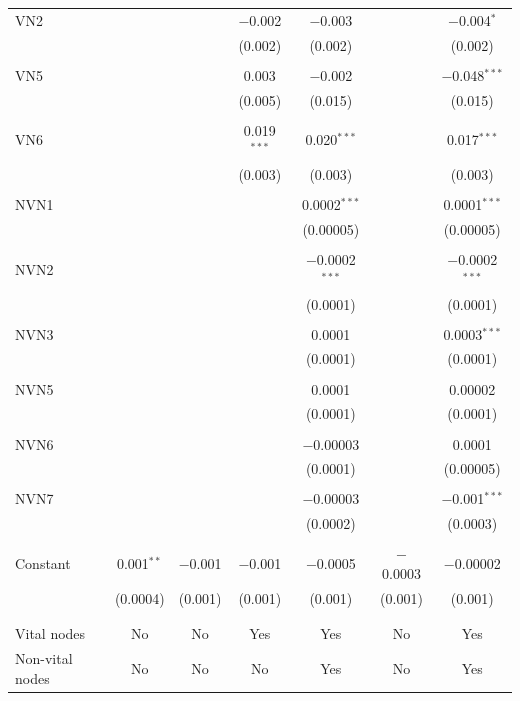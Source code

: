 \begin{table}[!htbp]
\begin{tabular}{@{\extracolsep{5pt}}lcccccc}
 VN2 &  &  & $-$0.002 & $-$0.003 &  & $-$0.004$^{*}$ \\ 
  &  &  & (0.002) & (0.002) &  & (0.002) \\ 
  & & & & & & \\ 
 VN5 &  &  & 0.003 & $-$0.002 &  & $-$0.048$^{***}$ \\ 
  &  &  & (0.005) & (0.015) &  & (0.015) \\ 
  & & & & & & \\ 
 VN6 &  &  & 0.019$^{***}$ & 0.020$^{***}$ &  & 0.017$^{***}$ \\ 
  &  &  & (0.003) & (0.003) &  & (0.003) \\ 
  & & & & & & \\ 
 NVN1 &  &  &  & 0.0002$^{***}$ &  & 0.0001$^{***}$ \\ 
  &  &  &  & (0.00005) &  & (0.00005) \\ 
  & & & & & & \\ 
 NVN2 &  &  &  & $-$0.0002$^{***}$ &  & $-$0.0002$^{***}$ \\ 
  &  &  &  & (0.0001) &  & (0.0001) \\ 
  & & & & & & \\ 
 NVN3 &  &  &  & 0.0001 &  & 0.0003$^{***}$ \\ 
  &  &  &  & (0.0001) &  & (0.0001) \\ 
  & & & & & & \\ 
 NVN5 &  &  &  & 0.0001 &  & 0.00002 \\ 
  &  &  &  & (0.0001) &  & (0.0001) \\ 
  & & & & & & \\ 
 NVN6 &  &  &  & $-$0.00003 &  & 0.0001 \\ 
  &  &  &  & (0.0001) &  & (0.00005) \\ 
  & & & & & & \\ 
 NVN7 &  &  &  & $-$0.00003 &  & $-$0.001$^{***}$ \\ 
  &  &  &  & (0.0002) &  & (0.0003) \\ 
  & & & & & & \\ 
 Constant & 0.001$^{**}$ & $-$0.001 & $-$0.001 & $-$0.0005 & $-$0.0003 & $-$0.00002 \\ 
  & (0.0004) & (0.001) & (0.001) & (0.001) & (0.001) & (0.001) \\ 
  & & & & & & \\ 
\hline \\[-1.8ex] 
Vital nodes & No & No & Yes & Yes & No & Yes \\ 
Non-vital nodes & No & No & No & Yes & No & Yes \\ 

\end{tabular}
\end{table}

